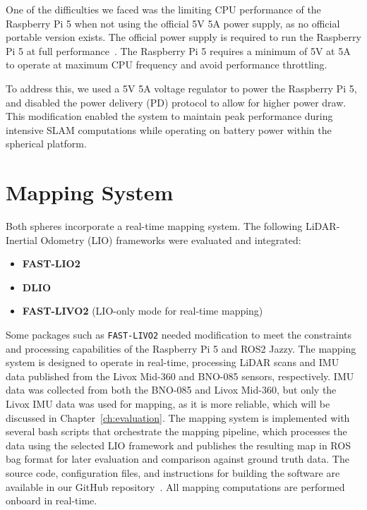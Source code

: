 \documentclass[english, bachelor, utf8]{base/thesis_telematics}
\begin{document}
One of the difficulties we faced was the limiting CPU performance of the Raspberry Pi 5 when not using the official 5V 5A power supply, as no official portable version exists. 
The official power supply is required to run the Raspberry Pi 5 at full performance~\cite{raspberrypi_psu}.
The Raspberry Pi 5 requires a minimum of 5V at 5A to operate at maximum CPU frequency and avoid performance throttling.

To address this, we used a 5V 5A voltage regulator to power the Raspberry Pi 5, and disabled the power delivery (PD) protocol to allow for higher power draw.
This modification enabled the system to maintain peak performance during intensive SLAM computations while operating on battery power within the spherical platform.


\section{Mapping System}
Both spheres incorporate a real-time mapping system. 
The following LiDAR-Inertial Odometry (LIO) frameworks were evaluated and integrated:
\begin{itemize}
    \item \textbf{FAST-LIO2}
    \item \textbf{DLIO}
    \item \textbf{FAST-LIVO2} (LIO-only mode for real-time mapping)
\end{itemize}

Some packages such as \texttt{FAST-LIVO2} needed modification to meet the constraints and processing capabilities of the Raspberry Pi 5 and ROS2 Jazzy.
The mapping system is designed to operate in real-time, processing LiDAR scans and IMU data published from the Livox Mid-360 and BNO-085 sensors, respectively.
IMU data was collected from both the BNO-085 and Livox Mid-360, but only the Livox IMU data was used for mapping, as it is more reliable, which will be discussed in Chapter~\ref{ch:evaluation}.
The mapping system is implemented with several bash scripts that orchestrate the mapping pipeline, which processes the data using the selected LIO framework and publishes the resulting map in ROS bag format for later evaluation and comparison against ground truth data.
The source code, configuration files, and instructions for building the software are available in our GitHub repository~\cite{githubsphere}.
All mapping computations are performed onboard in real-time.
\end{document}
